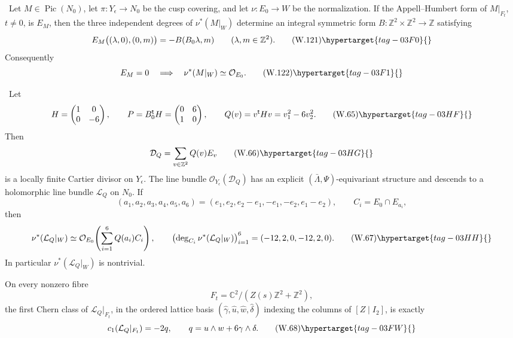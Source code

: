 
\begin{lemma}
\hypertarget{tag-03I6}{}\label{wbII:lem:analytic-support-specialization}


\ Let \(M\in\operatorname{Pic}(N_0)\), let
\(\pi:Y_\epsilon\to N_0\) be the cusp covering, and let
\(\nu:E_0\to W\) be the normalization.  If the Appell--Humbert form of
\(M|_{F_t}\), \(t\ne0\), is \(E_M\), then the three independent degrees
of \(\nu^*(M|_W)\) determine an integral symmetric form
\(B:\mathbb Z^2\times\mathbb Z^2\to\mathbb Z\) satisfying
\[
 E_M\bigl((\lambda,0),(0,m)\bigr)
 =-B(B_0\lambda,m)
 \qquad(\lambda,m\in\mathbb Z^2).
\tag{W.121}\hypertarget{tag-03F0}{}\label{wbII:eq:W:5.17-A21}
\]
Consequently
\[
 E_M=0
 \quad\Longrightarrow\quad
 \nu^*(M|_W)\simeq\mathcal O_{E_0}.
\tag{W.122}\hypertarget{tag-03F1}{}\label{wbII:eq:W:5.17-A22}
\]
\end{lemma}

\begin{proposition}
\hypertarget{tag-03IN}{}\label{wbII:prop:local-cusp-picard-obstruction}


\ Let
\[
 H=\begin{pmatrix}1&0\\0&-6\end{pmatrix},
 \qquad
 P=B_0^{\mathsf t}H=\begin{pmatrix}0&6\\1&0\end{pmatrix},
 \qquad
 Q(v)=v^{\mathsf t}Hv=v_1^2-6v_2^2.
\tag{W.65}\hypertarget{tag-03HF}{}\label{wbII:eq:W:5.17x}
\]
Then
\[
 \mathcal D_Q=\sum_{v\in\mathbb Z^2}Q(v)E_v
\tag{W.66}\hypertarget{tag-03HG}{}\label{wbII:eq:W:5.17y}
\]
is a locally finite Cartier divisor on \(Y_\epsilon\).
The line bundle \(\mathcal O_{Y_\epsilon}(\mathcal D_Q)\) has an explicit
\((\bar\Lambda,\Psi)\)-equivariant structure and descends to a holomorphic
line bundle \(\mathcal L_Q\) on \(N_0\).  If
\[
 (a_1,a_2,a_3,a_4,a_5,a_6)
 =(e_1,e_2,e_2-e_1,-e_1,-e_2,e_1-e_2),
 \qquad C_i=E_0\cap E_{a_i},
\]
then
\[
 \nu^*(\mathcal L_Q|_W)
 \simeq
 \mathcal O_{E_0}\!\left(\sum_{i=1}^6Q(a_i)C_i\right),
\qquad
 \left(\deg_{C_i}\nu^*(\mathcal L_Q|_W)\right)_{i=1}^6
 =(-12,2,0,-12,2,0).
\tag{W.67}\hypertarget{tag-03HH}{}\label{wbII:eq:W:5.17z}
\]
In particular \(\nu^*(\mathcal L_Q|_W)\) is nontrivial.

On every nonzero fibre
\[
 F_t=\mathbb C^2/(Z(s)\mathbb Z^2+\mathbb Z^2),
\]
the first Chern class of \(\mathcal L_Q|_{F_t}\), in the ordered lattice
basis
\((\widehat\gamma,\widehat u,\widehat w,\widehat\delta)\) indexing the
columns of \([Z\mid I_2]\), is exactly
\[
 c_1(\mathcal L_Q|_{F_t})=-2q,
 \qquad
 q=u\wedge w+6\gamma\wedge\delta.
\tag{W.68}\hypertarget{tag-03FW}{}\label{wbII:eq:W:5.17aa}
\]
\end{proposition}

